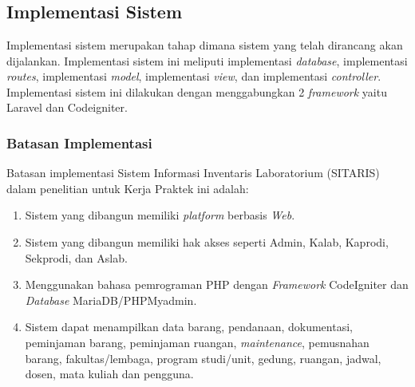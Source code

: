 %
%
%
%

\chapter{\babLima}
\thispagestyle{fancy} %
\section{Implementasi Sistem}
Implementasi sistem merupakan tahap dimana sistem yang telah dirancang akan dijalankan. Implementasi sistem ini meliputi implementasi \textit{database}, implementasi \textit{routes}, implementasi \textit{model}, implementasi \textit{view}, dan implementasi \textit{controller}. Implementasi sistem ini dilakukan dengan menggabungkan 2 \textit{framework} yaitu Laravel dan Codeigniter.

\subsection{Batasan Implementasi}
Batasan implementasi Sistem Informasi Inventaris Laboratorium (SITARIS) dalam penelitian untuk Kerja Praktek ini adalah:
\begin{enumerate}
	\item Sistem yang dibangun memiliki \textit{platform} berbasis\textit{ Web}.
	\item Sistem yang dibangun memiliki hak akses seperti Admin, Kalab, Kaprodi, Sekprodi, dan Aslab.
	\item Menggunakan bahasa pemrograman PHP dengan \textit{Framework} CodeIgniter dan \textit{Database} MariaDB/PHPMyadmin.
	\item Sistem dapat menampilkan data barang, pendanaan, dokumentasi, peminjaman barang, peminjaman ruangan, \textit{maintenance}, pemusnahan barang, fakultas/lembaga, program studi/unit, gedung, ruangan, jadwal, dosen, mata kuliah dan pengguna.
\end{enumerate}

